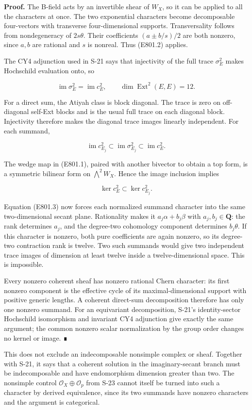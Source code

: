 \textbf{Proof.} The B-field acts by an invertible shear of \(W_X\), so
it can be applied to all the characters at once. The two exponential
characters become decomposable four-vectors with transverse
four-dimensional supports. Transversality follows from nondegeneracy of
\(2s\theta\). Their coefficients \((a\pm b/s)/2\) are both nonzero,
since \(a,b\) are rational and \(s\) is nonreal. Thus (E801.2) applies.

The CY4 adjunction used in S-21 says that injectivity of the full trace
\(\sigma_E^2\) makes Hochschild evaluation onto, so

\[
 \operatorname{im}\sigma_E^2=\operatorname{im}c_E^2,
 \qquad\dim\operatorname{Ext}^2(E,E)=12.
\]

For a direct sum, the Atiyah class is block diagonal. The trace is zero
on off-diagonal self-Ext blocks and is the usual full trace on each
diagonal block. Injectivity therefore makes the diagonal trace images
linearly independent. For each summand,

\[
 \operatorname{im}c_{E_j}^2\subset
 \operatorname{im}\sigma_{E_j}^2\subset\operatorname{im}c_E^2.
\]

The wedge map in (E801.1), paired with another bivector to obtain a top
form, is a symmetric bilinear form on \(\bigwedge^2W_X\). Hence the
image inclusion implies

\[
 \ker c_E^2\subset\ker c_{E_j}^2.
\]

Equation (E801.3) now forces each normalized summand character into the
same two-dimensional secant plane. Rationality makes it
\(a_j\alpha+b_j\beta\) with \(a_j,b_j\in\mathbf Q\): the rank determines
\(a_j\), and the degree-two cohomology component determines
\(b_j\theta\). If this character is nonzero, both pure coefficients are
again nonzero, so its degree-two contraction rank is twelve. Two such
summands would give two independent trace images of dimension at least
twelve inside a twelve-dimensional space. This is impossible.

Every nonzero coherent sheaf has nonzero rational Chern character: its
first nonzero component is the effective cycle of its
maximal-dimensional support with positive generic lengths. A coherent
direct-sum decomposition therefore has only one nonzero summand. For an
equivariant decomposition, S-21's identity-sector Hochschild isomorphism
and invariant CY4 adjunction give exactly the same argument; the common
nonzero scalar normalization by the group order changes no kernel or
image. ∎

This does not exclude an indecomposable nonsimple complex or sheaf.
Together with S-21, it says that a coherent solution in the
imaginary-secant branch must be indecomposable and have endomorphism
dimension greater than two. The nonsimple control
\(\mathcal O_X\oplus\mathcal O_p\) from S-23 cannot itself be turned
into such a character by derived equivalence, since its two summands
have nonzero characters and the argument is categorical.

